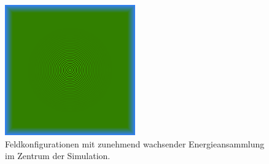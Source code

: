 \begin{figure}
    \begin{center}
        \includegraphics[width=0.5\textwidth]{papers/particles/figures/wavesim/particle_initial_state.png}
        \caption{Feldkonfigurationen mit zunehmend wachsender Energieansammlung im Zentrum der Simulation.\ }\label{particles:fig:partikel:wachsen}
    \end{center}
\end{figure}